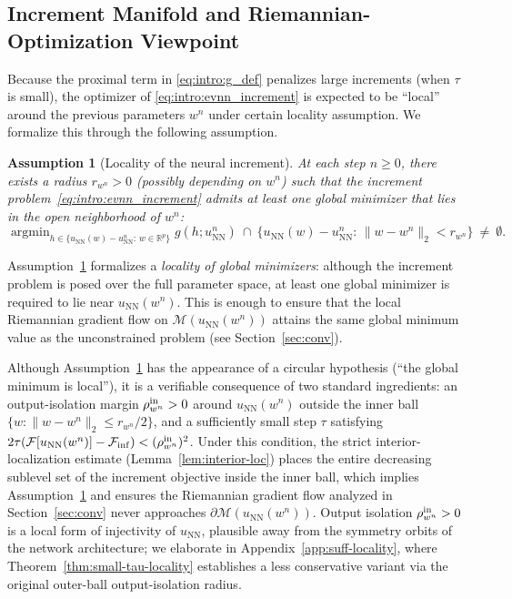 \documentclass[twoside,11pt]{article}
\newtheorem{assumption}[theorem]{Assumption}
\newcommand{\NN}{\mathrm{NN}}
\newcommand{\argmin}{\mathop{\mathrm{arg min}}}
\newcommand{\calF}{\mathcal{F}}
\newcommand{\calM}{\mathcal{M}}
\begin{document}
\subsection{Increment Manifold and Riemannian-Optimization Viewpoint}
Because the proximal term in \eqref{eq:intro:g_def} penalizes large increments (when $\tau$ is small), the optimizer of \eqref{eq:intro:evnn_increment} is expected to be ``local'' around the previous parameters $w^n$ under certain locality assumption. We formalize this through the following assumption.

\begin{assumption}[Locality of the neural increment]\label{ass:intro:locality}
At each step $n\ge 0$, there exists a radius $r_{w^n}>0$ (possibly depending on $w^n$) such that the increment problem~\eqref{eq:intro:evnn_increment} admits at least one global minimizer that lies in the open neighborhood of $w^n$:
\[
\argmin_{h\in \{u_{\NN}(w)-u^n_{\NN}:\,w\in\mathbb{R}^p\}} g(h;u^n_{\NN})
\ \cap\
\Big\{u_{\NN}(w)-u^n_{\NN}:\,\|w-w^n\|_2 < r_{w^n}\Big\}\ \neq\ \emptyset.
\]
\end{assumption}

Assumption~\ref{ass:intro:locality} formalizes a \emph{locality of global minimizers}:
although the increment problem is posed over the full parameter space,
at least one global minimizer is required to lie near $u_{\mathrm{NN}}(w^n)$.
This is enough to ensure that the local Riemannian gradient flow on $\calM(u_{\mathrm{NN}}(w^n))$
attains the same global minimum value as the unconstrained problem (see Section~\ref{sec:conv}).

Although Assumption~\ref{ass:intro:locality} has the appearance of a circular hypothesis (``the global minimum is local''), it is a verifiable consequence of two standard ingredients: an output-isolation margin $\rho^{\rm in}_{w^n}>0$ around $u_\NN(w^n)$ outside the inner ball $\{w : \|w-w^n\|_2\le r_{w^n}/2\}$, and a sufficiently small step $\tau$ satisfying $2\tau(\calF[u_\NN(w^n)]-\calF_{\inf}) < (\rho^{\rm in}_{w^n})^2$. Under this condition, the strict interior-localization estimate (Lemma~\ref{lem:interior-loc}) places the entire decreasing sublevel set of the increment objective inside the inner ball, which implies Assumption~\ref{ass:intro:locality} and ensures the Riemannian gradient flow analyzed in Section~\ref{sec:conv} never approaches $\partial\calM(u_\NN(w^n))$. Output isolation $\rho^{\rm in}_{w^n}>0$ is a local form of injectivity of $u_\NN$, plausible away from the symmetry orbits of the network architecture; we elaborate in Appendix~\ref{app:suff-locality}, where Theorem~\ref{thm:small-tau-locality} establishes a less conservative variant via the original outer-ball output-isolation radius.
\end{document}
